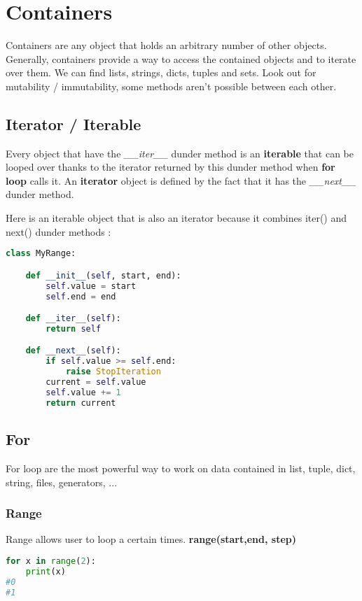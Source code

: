 \documentclass[a4paper, 12pt, titlepage]{scrartcl} %
\begin{document}
\newpage
\section{Containers}
Containers are any object that holds an arbitrary number of other objects. Generally, containers provide a way to access the contained objects and to iterate over them. We can find lists, strings, dicts, tuples and sets. Look out for mutability / immutability, some methods aren't possible between each other. 

\subsection{Iterator / Iterable}
Every object that have the \textit{\_\_iter\_\_} dunder method is an \textbf{iterable} that can be looped over thanks to the iterator returned by this dunder method when \textbf{for loop} calls it. An \textbf{iterator} object is defined by the fact that it has the \textit{\_\_next\_\_} dunder method. 

\vspace{5mm}

Here is an iterable object that is also an iterator because it combines iter() and next() dunder methods :
\begin{lstlisting}[language=Python]
class MyRange:

    def __init__(self, start, end):
        self.value = start
        self.end = end

    def __iter__(self):
        return self

    def __next__(self):
        if self.value >= self.end:
            raise StopIteration
        current = self.value
        self.value += 1
        return current
\end{lstlisting} \vspace{5mm}

\subsection{For}
\label{subsec:For}
For loop are the most powerful way to work on data contained in list, tuple, dict, string, files, generators, ... 

\subsubsection{Range}
Range allows user to loop a certain times. \textbf{range(start,end, step)}

\begin{lstlisting}[language=Python]
for x in range(2):
	print(x)
#0
#1
\end{lstlisting} \vspace{5mm}
\end{document}

